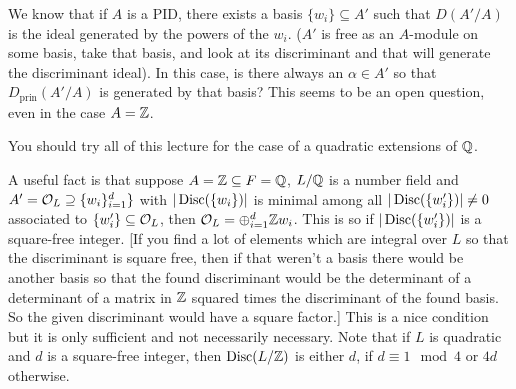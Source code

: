 We know that if $A$ is a PID, there exists a basis $\{w_i\} \subseteq A'$ such that $D(A'/A)$ is the ideal generated by the powers of the $w_i$. ($A'$ is free as an $A$-module on some basis, take that basis, and look at its discriminant and that will generate the discriminant ideal). In this case, is there always an $\alpha \in A'$ so that $D_{\text{prin}}(A'/A)$ is generated by that basis? This seems to be an open question, even in the case $A=\mathbb{Z}$. 

\begin{rem}
You should try all of this lecture for the case of a quadratic extensions of $\mathbb{Q}$. 
\end{rem}

A useful fact is that suppose $A=\mathbb{Z} \subseteq F=\mathbb{Q}$, $L/\mathbb{Q}$ is a number field and $A'=\mathcal{O}_L \supseteq \{w_i\}_{i=1}^d\}$ with $|\operatorname{Disc}(\{w_i\})|$ is minimal among all $|\operatorname{Disc}(\{w_i'\})| \neq 0$ associated to $\{w_i'\} \subseteq \mathcal{O}_L$, then $\mathcal{O}_L= \oplus_{i=1}^d \mathbb{Z} w_i$. This is so if $|\operatorname{Disc}(\{w_i'\})|$ is a square-free integer. [If you find a lot of elements which are integral over $L$ so that the discriminant is square free, then if that weren't a basis there would be another basis so that the found discriminant would be the determinant of a determinant of a matrix in $\mathbb{Z}$ squared times the discriminant of the found basis. So the given discriminant would have a square factor.] This is a nice condition but it is only sufficient and not necessarily necessary. Note that if $L$ is quadratic and $d$ is a square-free integer, then $\operatorname{Disc}(L/\mathbb{Z})$ is either $d$, if $d \equiv 1 \mod 4$ or $4d$ otherwise. 